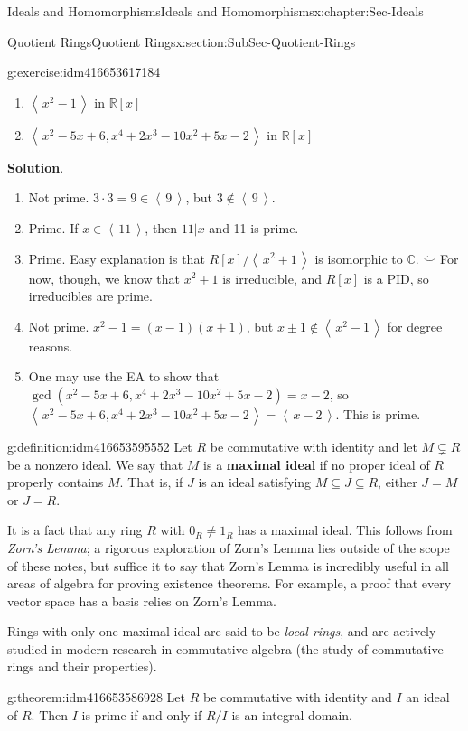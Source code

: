 \documentclass[oneside,10pt,]{book}
\newcommand{\terminology}[1]{\textbf{#1}}
\numberwithin{equation}{section}
\newcommand{\ideal}[1]{\left\langle\, #1 \,\right\rangle}
\def\C{{\mathbb C}}
\def\R{{\mathbb R}}
\begin{document}
\begin{chapterptx}{Ideals and Homomorphisms}{}{Ideals and Homomorphisms}{}{}{x:chapter:Sec-Ideals}
\begin{sectionptx}{Quotient Rings}{}{Quotient Rings}{}{}{x:section:SubSec-Quotient-Rings}
\begin{inlineexercise}{}{g:exercise:idm416653617184}
\begin{enumerate}
\item{}\(\ideal{x^2-1}\) in \(\R[x]\)%
\item{}\(\ideal{x^2-5x+6, x^4+2x^3-10x^2+5x-2}\) in \(\R[x]\)%
\end{enumerate}
%
\par\smallskip%
\noindent\textbf{Solution}.\hypertarget{g:solution:idm416653607184}{}\quad{}%
\begin{enumerate}
\item{}Not prime. \(3\cdot 3= 9\in \ideal{9}\), but \(3\notin\ideal{9}\).%
\item{}Prime. If \(x\in \ideal{11}\), then \(11|x\) and 11 is prime.%
\item{}Prime. Easy explanation is that \(R[x]/\ideal{x^2+1}\) is isomorphic to \(\C\). \(\ddot\smile\) For now, though, we know that \(x^2+1\) is irreducible, and \(R[x]\) is a PID, so irreducibles are prime.%
\item{}Not prime. \(x^2-1 = (x-1)(x+1)\), but \(x\pm 1\notin \ideal{x^2-1}\) for degree reasons.%
\item{}One may use the EA to show that \(\gcd(x^2-5x+6,x^4+2x^3-10x^2+5x-2) = x-2\), so \(\ideal{x^2-5x+6, x^4+2x^3-10x^2+5x-2} = \ideal{x-2}\). This is prime.%
\end{enumerate}
%
\end{inlineexercise}
\begin{definition}{}{g:definition:idm416653595552}%
Let \(R\) be commutative with identity and let \(M\subsetneq R\) be a nonzero ideal. We say that \(M\) is a \terminology{maximal ideal} if no proper ideal of \(R\) properly contains \(M\). That is, if \(J\) is an ideal satisfying \(M\subseteq J\subseteq R\), either \(J=M\) or \(J=R\).%
\end{definition}
It is a fact that any ring \(R\) with \(0_R\ne 1_R\) has a maximal ideal. This follows from \emph{Zorn's Lemma}; a rigorous exploration of Zorn's Lemma lies outside of the scope of these notes, but suffice it to say that Zorn's Lemma is incredibly useful in all areas of algebra for proving existence theorems. For example, a proof that every vector space has a basis relies on Zorn's Lemma.%
\par
Rings with only one maximal ideal are said to be \emph{local rings}, and are actively studied in modern research in commutative algebra (the study of commutative rings and their properties).%
\begin{theorem}{}{}{g:theorem:idm416653586928}%
Let \(R\) be commutative with identity and \(I\) an ideal of \(R\). Then \(I\) is prime if and only if \(R/I\) is an integral domain.%

\end{theorem}
\end{sectionptx}
\end{chapterptx}
\end{document}
